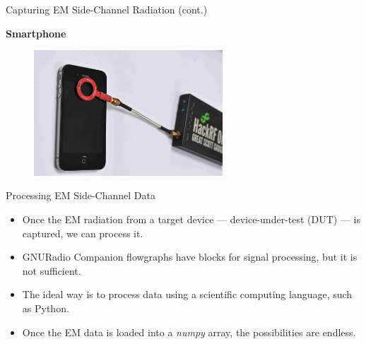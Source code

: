 \documentclass[handout]{beamer}
\begin{document}
\begin{frame}{Capturing EM Side-Channel Radiation (cont.)}  

\footnotesize
\textbf{Smartphone}

	\begin{figure}
		\includegraphics[width=200pt]{figures/iphone-hackrf.png}
	\end{figure}

\end{frame}


\begin{frame}{Processing EM Side-Channel Data}  

\begin{itemize}
\footnotesize
	\item Once the EM radiation from a target device --- device-under-test (DUT) --- is captured, we can process it.
		\vspace{10pt}
	\item GNURadio Companion flowgraphs have blocks for signal processing, but it is not sufficient.
		\vspace{10pt}
	\item The ideal way is to process data using a scientific computing language, such as Python.
		\vspace{10pt}
	\item Once the EM data is loaded into a \emph{numpy} array, the possibilities are endless.
\end{itemize}

\end{frame}
\end{document}
